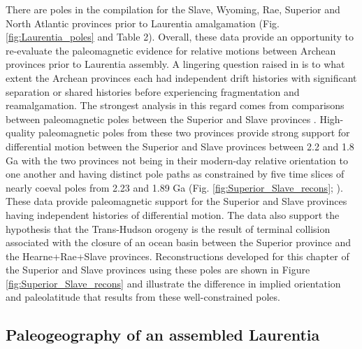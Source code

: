 \documentclass[11pt,letterpaper]{article}
\begin{document}
There are poles in the compilation for the Slave, Wyoming, Rae, Superior and North Atlantic provinces prior to Laurentia amalgamation (Fig. \ref{fig:Laurentia_poles} and Table 2). Overall, these data provide an opportunity to re-evaluate the paleomagnetic evidence for relative motions between Archean provinces prior to Laurentia assembly. A lingering question raised in \citet{Hoffman1988a} is to what extent the Archean provinces each had independent drift histories with significant separation or shared histories before experiencing fragmentation and reamalgamation. The strongest analysis in this regard comes from comparisons between paleomagnetic poles between the Superior and Slave provinces \citep{Buchan2009a, Mitchell2014a, Buchan2016a}. High-quality paleomagnetic poles from these two provinces provide strong support for differential motion between the Superior and Slave provinces between 2.2 and 1.8 Ga with the two provinces not being in their modern-day relative orientation to one another and having distinct pole paths as constrained by five time slices of nearly coeval poles from 2.23 and 1.89 Ga (Fig. \ref{fig:Superior_Slave_recons}; \citealp{Buchan2016a}). These data provide paleomagnetic support for the Superior and Slave provinces having independent histories of differential motion. The data also support the hypothesis that the Trans-Hudson orogeny is the result of terminal collision associated with the closure of an ocean basin between the Superior province and the Hearne+Rae+Slave provinces. Reconstructions developed for this chapter of the Superior and Slave provinces using these poles are shown in Figure \ref{fig:Superior_Slave_recons} and illustrate the difference in implied orientation and paleolatitude that results from these well-constrained poles.

\subsection{Paleogeography of an assembled Laurentia}
\end{document}
